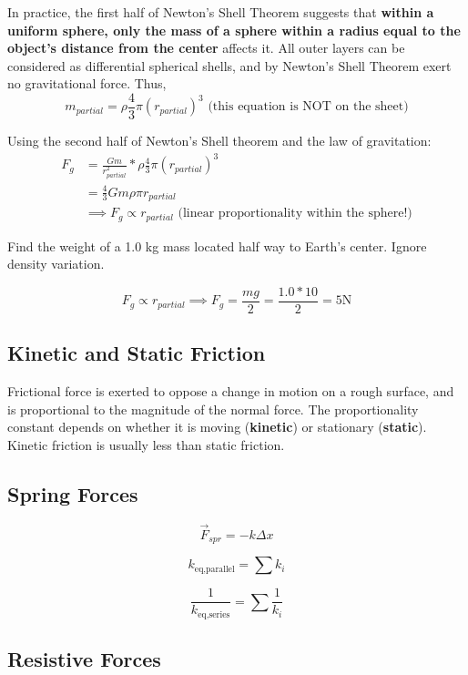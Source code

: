 \documentclass{article}
\begin{document}
In practice, the first half of Newton's Shell Theorem suggests that \textbf{within a uniform sphere, only the mass of a sphere within a radius equal to the object's distance from the center} affects it.
All outer layers can be considered as differential spherical shells, and by Newton's Shell Theorem exert no gravitational force.
Thus,
\[m_{partial} = \rho \frac{4}{3} \pi (r_{partial})^3 \textrm{ (this equation is NOT on the sheet)}\]

Using the second half of Newton's Shell theorem and the law of gravitation:
\begin{align*}
    F_g &= \frac{Gm}{r_{partial}^2} * \rho \frac{4}{3} \pi (r_{partial})^3 \\
    &= \frac{4}{3} Gm \rho \pi r_{partial} \\
    &\implies F_g \propto r_{partial} \textrm{ (linear proportionality within the sphere!)}
\end{align*}

\begin{example}
    Find the weight of a 1.0 kg mass located half way to Earth's center. Ignore density variation.
\end{example}
\begin{answer}
    \[F_g \propto r_{partial} \implies F_g = \frac{mg}{2} = \frac{1.0 * 10}{2} = \boxed{5 \unit{\newton}}\]
\end{answer}

\subsection{Kinetic and Static Friction}

Frictional force is exerted to oppose a change in motion on a rough surface, and is proportional to the magnitude of the normal force.
The proportionality constant depends on whether it is moving (\textbf{kinetic}) or stationary (\textbf{static}).
Kinetic friction is usually less than static friction.

\subsection{Spring Forces}

\[\vec{F}_{spr} = -k\Delta x\]

\[k_{\textrm{eq,parallel}} = \sum k_i\]

\[\frac{1}{k_{\textrm{eq,series}}} = \sum \frac{1}{k_i}\]

\subsection{Resistive Forces}
\end{document}
